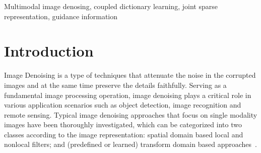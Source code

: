 \documentclass{article}
\begin{document}
\begin{keywords}
	Multimodal image denosing, coupled dictionary learning, joint sparse representation, guidance information
\end{keywords}



\section{Introduction}
\label{sec:intro}

\vspace{-0.2cm}

Image Denoising is a type of techniques that attenuate the noise in the corrupted images and at the same time preserve the details faithfully. Serving as a fundamental image processing operation, image denoising plays a critical role in various application scenarios such as object detection, image recognition and remote sensing\cite{shao2014heuristic}.
%
Typical image denoising approaches that focus on single modality images have been thoroughly investigated, which can be categorized into two classes according to the image representation: spatial domain based local and nonlocal filters\cite{zhu2010automatic,bouboulis2010adaptive, buades2005non,nguyen2017bounded,talebi2014global,romano2015boosting}; and (predefined or learned) transform domain based approaches~\cite{dabov2007image, zhang2010two, chatterjee2012patch, elad2006image, mairal2009non}.
\end{document}

